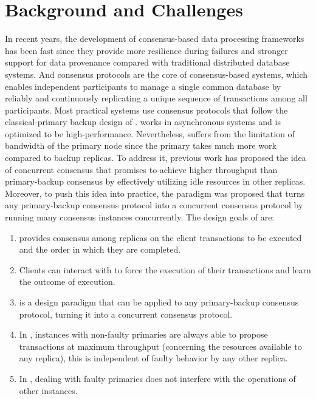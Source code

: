 \section{Background and Challenges}
In recent years, the development of consensus-based data processing frameworks \cite{pbft, bitcoin, ethereum} has been fast 
since they provide more resilience during failures and stronger support for data provenance compared with traditional 
distributed database systems. And consensus protocols are the core of consensus-based systems, 
which enables independent participants to manage a single common database by reliably and continuously 
replicating a unique sequence of transactions among all participants. Most practical systems use 
consensus protocols that follow the classical-primary backup design of \PBFT{}. \PBFT{} works in asynchronous 
systems and is optimized to be high-performance. Nevertheless, \PBFT{} suffers 
from the limitation of bandwidth of the primary node since the primary takes much more work compared to backup replicas. 
To address it, previous work has proposed the idea of concurrent consensus that promises to achieve higher throughput 
than primary-backup consensus by effectively utilizing idle resources in other replicas. Moreover, to 
push this idea into practice, the \RCC{} paradigm was proposed that turns any 
primary-backup consensus protocol into a concurrent consensus protocol by running many consensus 
instances concurrently. The design goals of \RCC{} \cite{rcc} are:
\begin{enumerate}
    \item  \RCC{} provides consensus among replicas on the client transactions to be executed and the order in which they are completed.
    \item  Clients can interact with \RCC{} to force the execution of their transactions and learn the outcome of execution.
    \item  \RCC{} is a design paradigm that can be applied to any primary-backup consensus protocol, turning it into a concurrent consensus protocol.
    \item  In \RCC{}, instances with non-faulty primaries are always able to propose transactions at maximum throughput (concerning the resources available to any replica), this is independent of faulty behavior by any other replica.
    \item  In \RCC{}, dealing with faulty primaries does not interfere with the operations of other instances.
\end{enumerate}

